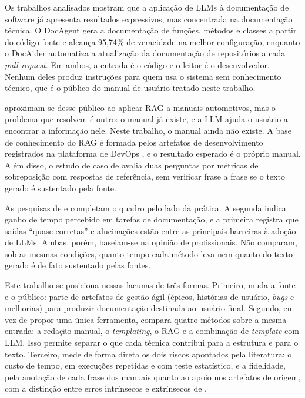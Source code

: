 Os trabalhos analisados mostram que a aplicação de LLMs à documentação de
software já apresenta resultados expressivos, mas concentrada na
documentação técnica. O DocAgent \cite{yang2025} gera a documentação de
funções, métodos e classes a partir do código-fonte e alcança 95,74\% de
veracidade na melhor configuração, enquanto o DocAider \cite{jakupov2026}
automatiza a atualização da documentação de repositórios a cada
\textit{pull request}. Em ambos, a entrada é o código e o leitor é o
desenvolvedor. Nenhum deles produz instruções para quem usa o sistema sem
conhecimento técnico, que é o público do manual de usuário tratado neste
trabalho.

 aproximam-se desse público ao aplicar RAG a
manuais automotivos, mas o problema que resolvem é outro: o manual já
existe, e a LLM ajuda o usuário a encontrar a informação nele. Neste
trabalho, o manual ainda não existe. A base de conhecimento do RAG é
formada pelos artefatos de desenvolvimento registrados na plataforma de
DevOps \cite{Montgomery2024_DevOps}, e o resultado esperado é o próprio
manual. Além disso, o estudo de caso de  avalia
duas perguntas por métricas de sobreposição com respostas de referência,
sem verificar frase a frase se o texto gerado é sustentado pela fonte.

As pesquisas de  e 
completam o quadro pelo lado da prática. A segunda indica ganho de tempo
percebido em tarefas de documentação, e a primeira registra que saídas
``quase corretas'' e alucinações estão entre as principais barreiras à
adoção de LLMs. Ambas, porém, baseiam-se na opinião de profissionais. Não
comparam, sob as mesmas condições, quanto tempo cada método leva nem
quanto do texto gerado é de fato sustentado pelas fontes.

Este trabalho se posiciona nessas lacunas de três formas. Primeiro, muda a
fonte e o público: parte de artefatos de gestão ágil (épicos, histórias de
usuário, \textit{bugs} e melhorias) para produzir documentação destinada
ao usuário final. Segundo, em vez de propor uma única ferramenta, compara
quatro métodos sobre a mesma entrada: a redação manual, o
\textit{templating}, o RAG e a combinação de \textit{template} com LLM.
Isso permite separar o que cada técnica contribui para a estrutura e para
o texto. Terceiro, mede de forma direta os dois riscos apontados pela
literatura: o custo de tempo, em execuções repetidas e com teste
estatístico, e a fidelidade, pela anotação de cada frase dos manuais
quanto ao apoio nos artefatos de origem, com a distinção entre erros
intrínsecos e extrínsecos de .

